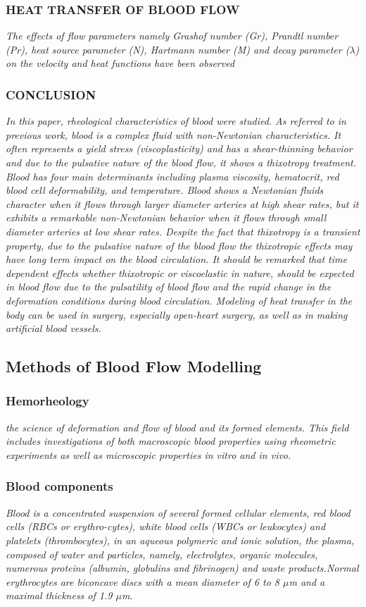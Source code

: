 \documentclass[11pt,letterpaper]{article}
\begin{document}
\subsubsection*{HEAT TRANSFER OF BLOOD FLOW}
\textit{The effects of flow parameters namely Grashof number (Gr), Prandtl number (Pr), heat source parameter (N), Hartmann number (M) and decay parameter ($\lambda$) on the velocity and heat functions have been observed}
\subsubsection*{CONCLUSION} \textit{In this paper, rheological characteristics of blood were studied. As referred to in previous work, blood is a complex fluid with non-Newtonian characteristics. It often represents a yield stress (viscoplasticity) and has a shear-thinning behavior and due to the pulsative nature of the blood flow, it shows a thixotropy treatment. Blood has four main determinants including plasma viscosity, hematocrit, red blood cell deformability, and temperature. Blood shows a Newtonian fluids character when it flows through larger diameter arteries at high shear rates, but it exhibits a remarkable non-Newtonian behavior when it flows through small diameter arteries at low shear rates. Despite the fact that thixotropy is a transient property, due to the pulsative nature of the blood flow the thixotropic effects may have long term impact on the blood circulation. It should be remarked that time dependent effects whether thixotropic or viscoelastic in nature, should be expected in blood flow due to the pulsatility of blood flow and the rapid change in the deformation conditions during blood circulation. Modeling of heat transfer in the body can be used in surgery, especially open-heart surgery, as well as in making artificial blood vessels.}



\newpage
\subsection{Methods of Blood Flow Modelling}
\subsubsection*{Hemorheology}
\textit{ the science of deformation and flow of blood and its formed elements. This field includes investigations of both macroscopic blood properties using rheometric experiments as well as microscopic properties in vitro and in vivo. }
\subsubsection*{Blood components} 
\textit{Blood is a concentrated suspension of several formed cellular elements, red blood cells (RBCs or erythro-cytes), white blood cells (WBCs or leukocytes) and platelets (thrombocytes), in an aqueous polymeric and ionic solution, the plasma, composed of  water and particles, namely, electrolytes, organic
molecules, numerous proteins (albumin, globulins and fibrinogen) and waste products.\newline [...] 
Normal erythrocytes are biconcave discs with a mean
diameter of 6 to 8 $\mu$m and a maximal thickness of 1.9 $\mu$m.}
\end{document}
